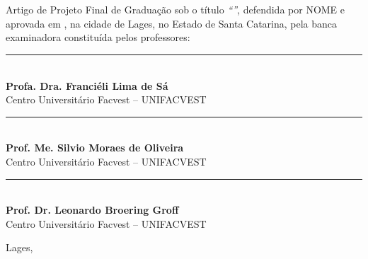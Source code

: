 \documentclass[12pt,a4paper,header, times]{abnt}
\begin{document}
\begin{folhadeaprovacao}

\thispagestyle{logouff}

\hspace{.2\textwidth} %
\begin{minipage}{.7\textwidth}

\begin{flushright}

{\large \bf \ABNTautordata}\\[1cm]

{\large \bf \ABNTtitulodata}\\[1cm]

\end{flushright}
Artigo de Projeto Final de Graduação sob o título \textit{``\ABNTtitulodata''},
defendida por NOME e aprovada em \ABNTdatadata, na cidade de Lages,
no Estado de Santa Catarina, pela banca examinadora constituída pelos
professores:
\begin{flushright}

\begin{espacosimples}





\vspace{1.5cm}
\noindent\rule{10cm}{0.4pt}\\
{\bf Profa. Dra. Franciéli Lima de Sá}\\
Centro Universitário Facvest -- UNIFACVEST\\


\vspace{1.5cm}
\noindent\rule{10cm}{0.4pt}\\
{\bf Prof. Me. Silvio Moraes de Oliveira}\\
Centro Universitário Facvest -- UNIFACVEST\\


\vspace{1.5cm}
\noindent\rule{10cm}{0.4pt}\\
{\bf Prof. Dr. Leonardo Broering Groff}\\
Centro Universitário Facvest -- UNIFACVEST\\

\end{espacosimples}

\end{flushright}

\vspace{1.5cm}
\hfill Lages, \ABNTdatadata

\end{minipage}

\end{folhadeaprovacao}
\end{document}
